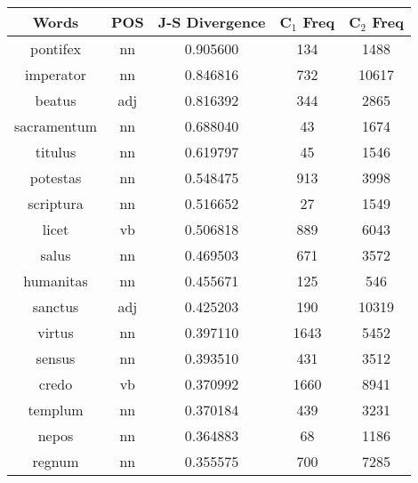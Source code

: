 \begin{table}
\centering
\begin{tabular}{ccccc} 
\toprule
\textbf{ Words } & \textbf{ POS } & \textbf{ J-S Divergence } & \textbf{ C$_1$ Freq } & \textbf{ C$_2$ Freq }  \\ 
\midrule
pontifex         & nn            & 0.905600           & 134                & 1488                \\
imperator        & nn            & 0.846816           & 732                & 10617               \\
beatus           & adj           & 0.816392           & 344                & 2865                \\
sacramentum      & nn            & 0.688040           & 43                 & 1674                \\
titulus          & nn            & 0.619797           & 45                 & 1546                \\
potestas         & nn            & 0.548475           & 913                & 3998                \\
scriptura        & nn            & 0.516652           & 27                 & 1549                \\
licet            & vb            & 0.506818           & 889                & 6043                \\
salus            & nn            & 0.469503           & 671                & 3572                \\
humanitas        & nn            & 0.455671           & 125                & 546                 \\
sanctus          & adj           & 0.425203           & 190                & 10319               \\
virtus           & nn            & 0.397110           & 1643               & 5452                \\
sensus           & nn            & 0.393510           & 431                & 3512                \\
credo            & vb            & 0.370992           & 1660               & 8941                \\
templum          & nn            & 0.370184           & 439                & 3231                \\
nepos            & nn            & 0.364883           & 68                 & 1186                \\
regnum           & nn            & 0.355575           & 700                & 7285                \\

\end{tabular}
\end{table}
